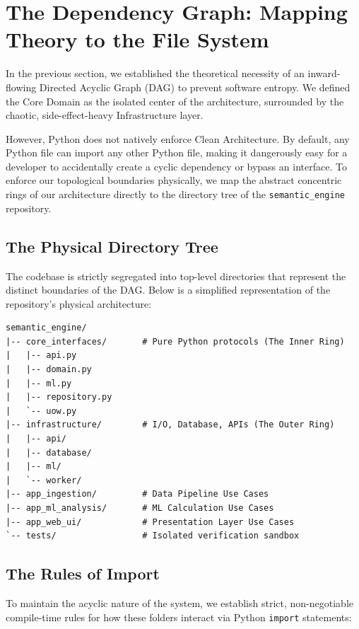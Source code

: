 \section{The Dependency Graph: Mapping Theory to the File System}

In the previous section, we established the theoretical necessity of an inward-flowing Directed Acyclic Graph (DAG) to prevent software entropy. We defined the Core Domain as the isolated center of the architecture, surrounded by the chaotic, side-effect-heavy Infrastructure layer.

However, Python does not natively enforce Clean Architecture. By default, any Python file can import any other Python file, making it dangerously easy for a developer to accidentally create a cyclic dependency or bypass an interface. To enforce our topological boundaries physically, we map the abstract concentric rings of our architecture directly to the directory tree of the \texttt{semantic\_engine} repository.

\subsection*{The Physical Directory Tree}

The codebase is strictly segregated into top-level directories that represent the distinct boundaries of the DAG. Below is a simplified representation of the repository's physical architecture:

\begin{verbatim}
semantic_engine/
|-- core_interfaces/       # Pure Python protocols (The Inner Ring)
|   |-- api.py
|   |-- domain.py
|   |-- ml.py
|   |-- repository.py
|   `-- uow.py
|-- infrastructure/        # I/O, Database, APIs (The Outer Ring)
|   |-- api/
|   |-- database/
|   |-- ml/
|   `-- worker/
|-- app_ingestion/         # Data Pipeline Use Cases
|-- app_ml_analysis/       # ML Calculation Use Cases
|-- app_web_ui/            # Presentation Layer Use Cases
`-- tests/                 # Isolated verification sandbox
\end{verbatim}

\subsection*{The Rules of Import}

To maintain the acyclic nature of the system, we establish strict, non-negotiable compile-time rules for how these folders interact via Python \texttt{import} statements:


